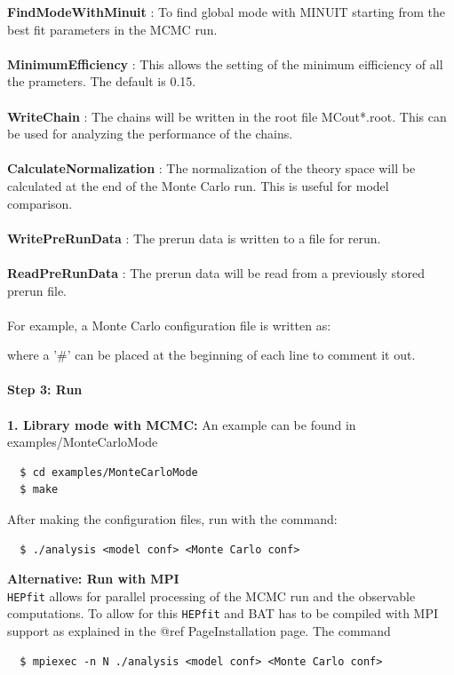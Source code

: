 \documentclass[preprint,3p,12pt]{elsarticle}
\newcommand{\HEPfit}{\texttt{HEPfit}\xspace}
\begin{document}
{\bf FindModeWithMinuit} : To find global mode with MINUIT starting
from the best fit parameters in the MCMC run.\\\\
{\bf MinimumEfficiency}  : This allows the setting of the minimum eifficiency of 
all the prameters. The default is 0.15.\\\\
{\bf WriteChain}        : The chains will be written in the root file MCout*.root. 
This can be used for analyzing the performance of the chains.\\\\
{\bf CalculateNormalization} : The normalization of the theory space will be calculated
at the end of the Monte Carlo run. This is useful for model comparison.\\\\
{\bf WritePreRunData} : The prerun data is written to a file for rerun.      \\\\
{\bf ReadPreRunData}  : The prerun data will be read from a previously stored prerun file. \\\\
For example, a Monte Carlo configuration file is written as: 



where a '\#' can be placed at the beginning of each line to comment it out.\\\\
%
{\bf \large Step 3: Run}\\\\
%
{\bf 1. Library mode with MCMC:  }An example can be found in examples/MonteCarloMode

\begin{lstlisting}
  $ cd examples/MonteCarloMode
  $ make
\end{lstlisting}

After making the configuration files, run with the command:
\begin{lstlisting}
  $ ./analysis <model conf> <Monte Carlo conf>
\end{lstlisting}
%
{\bf Alternative: Run with MPI}\\ \HEPfit allows for parallel processing of the MCMC run and the observable computations.
To allow for this \HEPfit and BAT has to be compiled with MPI support as explained in the
@ref PageInstallation page. The command

\begin{lstlisting}
  $ mpiexec -n N ./analysis <model conf> <Monte Carlo conf>
\end{lstlisting}
\end{document}
